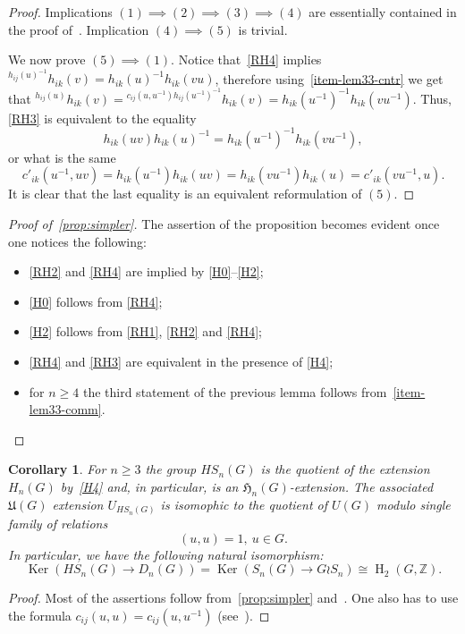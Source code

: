 \documentclass[oneside, 12pt]{amsart}
\theoremstyle{plain}
\numberwithin{equation}{section}
\numberwithin{lemma}{section}
\newtheorem{cor}[lemma]{Corollary}
\theoremstyle{remark}
\theoremstyle{definition}
\DeclareMathOperator{\HH}{H}
\DeclareMathOperator{\Ker}{Ker}
\newcommand{\ZZ}{\mathbb{Z}}
\begin{document}
\begin{proof}
Implications $(1) \implies (2) \implies (3) \implies (4)$ are essentially contained in the proof of~\cite[Lemmas~2.1-2.2]{Reh78}.
Implication $(4) \implies (5)$ is trivial.

We now prove $(5) \implies (1)$. Notice that~\eqref{RH4} implies ${}^{h_{ij}(u)^{-1}}h_{ik}(v) = h_{ik}(u)^{-1} h_{ik}(vu)$, therefore
using~\cref{item-lem33-cntr} we get that ${}^{h_{ij}(u)}h_{ik}(v) = {}^{c_{ij}(u, u^{-1}) h_{ij}(u^{-1})^{-1}}h_{ik}(v) = h_{ik}(u^{-1})^{-1} h_{ik}(vu^{-1}).$
Thus, \eqref{RH3} is equivalent to the equality 
\[ h_{ik}(uv) h_{ik}(u)^{-1} = h_{ik}(u^{-1})^{-1} h_{ik}(vu^{-1}),\]
or what is the same
\[c'_{ik}(u^{-1}, uv) = h_{ik}(u^{-1}) h_{ik}(uv) =  h_{ik}(vu^{-1}) h_{ik}(u) = c'_{ik}(vu^{-1}, u).\]
It is clear that the last equality is an equivalent reformulation of $(5)$.
\end{proof}

\begin{proof}[Proof of~\cref{prop:simpler}]
The assertion of the proposition becomes evident once one notices the following:
\begin{itemize}
 \item \eqref{RH2} and \eqref{RH4} are implied by \eqref{H0}--\eqref{H2};
 \item \eqref{H0} follows from \eqref{RH4};
 \item \eqref{H2} follows from \eqref{RH1}, \eqref{RH2} and \eqref{RH4};
 \item \eqref{RH4} and \eqref{RH3} are equivalent in the presence of \eqref{H4};
 \item for $n\geq 4$ the third statement of the previous lemma follows from~\cref{item-lem33-comm}.
\end{itemize}
\end{proof}

\begin{cor} \label{cor:main} For $n \geq 3$ the group $HS_n(G)$ is the quotient of the extension $H_n(G)$ by~\eqref{H4} and, in particular, is an $\mathfrak{H}_n(G)$-extension.
The associated $\mathfrak{U}(G)$ extension $U_{HS_n(G)}$ is isomophic to the quotient of $U(G)$ modulo single family of relations
\begin{equation} \nonumber (u, u) = 1, \ u\in G. \end{equation}
In particular, we have the following natural isomorphism:
\begin{equation} \Ker(HS_n(G) \to D_n(G)) = \Ker(S_n(G) \to G \wr S_n) \cong \HH_2(G, \ZZ). \end{equation} \end{cor}
\begin{proof}
Most of the assertions follow from~\cref{prop:simpler} and~\cite[Proposition~5]{De76}.
One also has to use the formula $c_{ij}(u, u) = c_{ij}(u, u^{-1})$ (see~\cite[p.~87]{Reh78}).
\end{proof}
\end{document}
